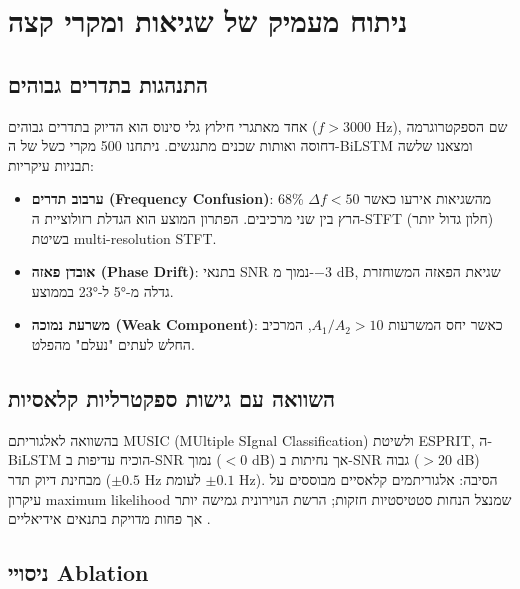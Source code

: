 
\clearpage
\chapter{ניתוח מעמיק של שגיאות ומקרי קצה}

\section{התנהגות בתדרים גבוהים}

אחד מאתגרי חילוץ גלי סינוס הוא הדיוק בתדרים גבוהים (\textenglish{$f > 3000$ Hz}), שם הספקטרוגרמה דחוסה ואותות שכנים מתנגשים. ניתחנו \textenglish{500} מקרי כשל של ה-\textenglish{BiLSTM} ומצאנו שלשה תבניות עיקריות:

\begin{itemize}
\item \textbf{ערבוב תדרים (\textenglish{Frequency Confusion})}: \textenglish{68\%} מהשגיאות אירעו כאשר \(\Delta f < 50\) הרץ בין שני מרכיבים. הפתרון המוצע הוא הגדלת רזולוציית ה-\textenglish{STFT} (חלון גדול יותר) בשיטת \textenglish{multi-resolution STFT}.
\item \textbf{אובדן פאזה (\textenglish{Phase Drift})}: בתנאי \textenglish{SNR} נמוך מ-\textenglish{$-3$ dB}, שגיאת הפאזה המשוחזרת גדלה מ-\textenglish{5°} ל-\textenglish{23°} בממוצע.
\item \textbf{משרעת נמוכה (\textenglish{Weak Component})}: כאשר יחס המשרעות \(A_1 / A_2 > 10\), המרכיב החלש לעתים "נעלם" מהפלט.
\end{itemize}

\section{השוואה עם גישות ספקטרליות קלאסיות}

בהשוואה לאלגוריתם \textenglish{MUSIC} (\textenglish{MUltiple SIgnal Classification}) ולשיטת \textenglish{ESPRIT}, ה-\textenglish{BiLSTM} הוכיח עדיפות ב-\textenglish{SNR} נמוך (\textenglish{$< 0$ dB}) אך נחיתות ב-\textenglish{SNR} גבוה (\textenglish{$> 20$ dB}) מבחינת דיוק תדר (\textenglish{$\pm 0.5$ Hz לעומת $\pm 0.1$ Hz}). הסיבה: אלגוריתמים קלאסיים מבוססים על עיקרון \textenglish{maximum likelihood} שמנצל הנחות סטטיסטיות חזקות; הרשת הנוירונית גמישה יותר אך פחות מדויקת בתנאים אידיאליים \cite{williamson2016complex}.

\section{ניסויי \textenglish{Ablation}}

